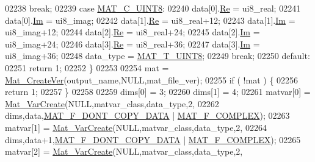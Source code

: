 \begin{DoxyCode}
{{{{{02238             \textcolor{keywordflow}{break};
02239         \textcolor{keywordflow}{case} \hyperlink{group___m_a_t_ggad4d60ae7b709fc81bfd744fb4c857c40a81270f8093cb4808e992c1d29d84d4e3}{MAT\_C\_UINT8}:
02240             data[0].\hyperlink{group___m_a_t_a484a93607508adac2bce53a0252e0325}{Re} = ui8\_real;
02241             data[0].\hyperlink{group___m_a_t_a7182d10b0d3598415887376065440946}{Im} = ui8\_imag;
02242             data[1].\hyperlink{group___m_a_t_a484a93607508adac2bce53a0252e0325}{Re} = ui8\_real+12;
02243             data[1].\hyperlink{group___m_a_t_a7182d10b0d3598415887376065440946}{Im} = ui8\_imag+12;
02244             data[2].\hyperlink{group___m_a_t_a484a93607508adac2bce53a0252e0325}{Re} = ui8\_real+24;
02245             data[2].\hyperlink{group___m_a_t_a7182d10b0d3598415887376065440946}{Im} = ui8\_imag+24;
02246             data[3].\hyperlink{group___m_a_t_a484a93607508adac2bce53a0252e0325}{Re} = ui8\_real+36;
02247             data[3].\hyperlink{group___m_a_t_a7182d10b0d3598415887376065440946}{Im} = ui8\_imag+36;
02248             data\_type = \hyperlink{group___m_a_t_ggacf7b3b879282b7ab3a51190e49bf3453a01c1bd7db68f90552862eb5d311be408}{MAT\_T\_UINT8};
02249             \textcolor{keywordflow}{break};
02250         \textcolor{keywordflow}{default}:
02251             \textcolor{keywordflow}{return} 1;
02252     \}
02253 
02254     mat = \hyperlink{group___m_a_t_ga22d404f203af7869c841400e7ad247cf}{Mat\_CreateVer}(output\_name,NULL,mat\_file\_ver);
02255     \textcolor{keywordflow}{if} ( !mat ) \{
02256         \textcolor{keywordflow}{return} 1;
02257     \}
02258 
02259     dims[0] = 3;
02260     dims[1] = 4;
02261     matvar[0] = \hyperlink{group___m_a_t_ga1c54a84bb4d810c6fccdb8869489eac4}{Mat\_VarCreate}(NULL,matvar\_class,data\_type,2,
02262                    dims,data,\hyperlink{group___m_a_t_ggab9d6ef9e3ddca78a317b173f01d53fbba762244499f52eb35e7b53fb79a1f2889}{MAT\_F\_DONT\_COPY\_DATA} | 
      \hyperlink{group___m_a_t_ggab9d6ef9e3ddca78a317b173f01d53fbbacd7b091a11184aad7fc6078c04470780}{MAT\_F\_COMPLEX});
02263     matvar[1] = \hyperlink{group___m_a_t_ga1c54a84bb4d810c6fccdb8869489eac4}{Mat\_VarCreate}(NULL,matvar\_class,data\_type,2,
02264                    dims,data+1,\hyperlink{group___m_a_t_ggab9d6ef9e3ddca78a317b173f01d53fbba762244499f52eb35e7b53fb79a1f2889}{MAT\_F\_DONT\_COPY\_DATA} | 
      \hyperlink{group___m_a_t_ggab9d6ef9e3ddca78a317b173f01d53fbbacd7b091a11184aad7fc6078c04470780}{MAT\_F\_COMPLEX});
02265     matvar[2] = \hyperlink{group___m_a_t_ga1c54a84bb4d810c6fccdb8869489eac4}{Mat\_VarCreate}(NULL,matvar\_class,data\_type,2,
}}}}}
\end{DoxyCode}
